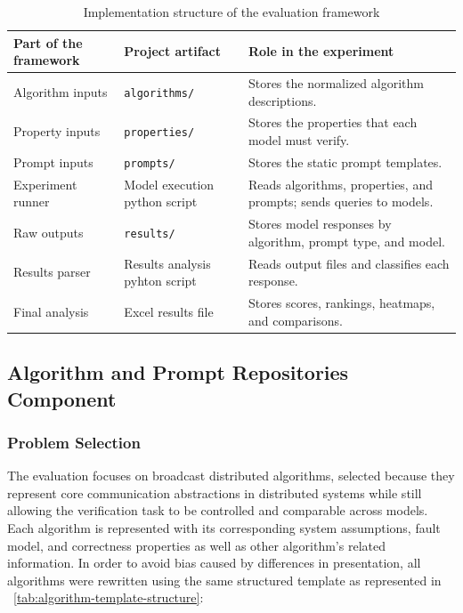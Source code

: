 \begin{table}[H]
\centering
\renewcommand{\arraystretch}{1.25}
\caption{Implementation structure of the evaluation framework}
\label{tab:implementation-structure}
\begin{tabular}{|>{\raggedright\arraybackslash}p{4cm}|
                >{\raggedright\arraybackslash}p{4cm}|
                >{\raggedright\arraybackslash}p{5.5cm}|}
\hline
\textbf{Part of the framework} & \textbf{Project artifact} & \textbf{Role in the experiment} \\
\hline
Algorithm inputs & \texttt{algorithms/} & Stores the normalized algorithm descriptions. \\
\hline
Property inputs & \texttt{properties/} & Stores the properties that each model must verify. \\
\hline
Prompt inputs & \texttt{prompts/} & Stores the static prompt templates. \\
\hline
Experiment runner & Model execution python script & Reads algorithms, properties, and prompts; sends queries to models. \\
\hline
Raw outputs & \texttt{results/} & Stores model responses by algorithm, prompt type, and model. \\
\hline
Results parser & Results analysis pyhton script & Reads output files and classifies each response. \\
\hline
Final analysis & Excel results file & Stores scores, rankings, heatmaps, and comparisons. \\
\hline
\end{tabular}
\end{table}

\subsection{Algorithm and Prompt Repositories Component}
\subsubsection{Problem Selection}
The evaluation focuses on broadcast distributed algorithms, selected because they represent core communication abstractions in distributed systems while still allowing the verification task to be controlled and comparable across models. Each algorithm is represented with its corresponding system assumptions, fault model, and correctness properties as well as other algorithm's related information. In order to avoid bias caused by differences in presentation, all algorithms were rewritten using the same structured template as represented in ~\ref{tab:algorithm-template-structure}:

